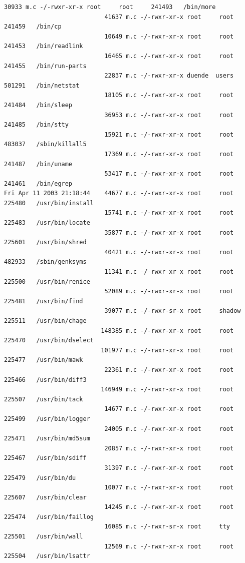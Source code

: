 {\begin{lstlisting}[style=terminal]
                            30933 m.c -/-rwxr-xr-x root     root     241493   /bin/more
                            41637 m.c -/-rwxr-xr-x root     root     241459   /bin/cp
                            10649 m.c -/-rwxr-xr-x root     root     241453   /bin/readlink
                            16465 m.c -/-rwxr-xr-x root     root     241455   /bin/run-parts
                            22837 m.c -/-rwxr-xr-x duende  users    501291   /bin/netstat
                            18105 m.c -/-rwxr-xr-x root     root     241484   /bin/sleep
                            36953 m.c -/-rwxr-xr-x root     root     241485   /bin/stty
                            15921 m.c -/-rwxr-xr-x root     root     483037   /sbin/killall5
                            17369 m.c -/-rwxr-xr-x root     root     241487   /bin/uname
                            53417 m.c -/-rwxr-xr-x root     root     241461   /bin/egrep
Fri Apr 11 2003 21:18:44    44677 m.c -/-rwxr-xr-x root     root     225480   /usr/bin/install
                            15741 m.c -/-rwxr-xr-x root     root     225483   /usr/bin/locate
                            35877 m.c -/-rwxr-xr-x root     root     225601   /usr/bin/shred
                            40421 m.c -/-rwxr-xr-x root     root     482933   /sbin/genksyms
                            11341 m.c -/-rwxr-xr-x root     root     225500   /usr/bin/renice
                            52089 m.c -/-rwxr-xr-x root     root     225481   /usr/bin/find
                            39077 m.c -/-rwxr-sr-x root     shadow   225511   /usr/bin/chage
                           148385 m.c -/-rwxr-xr-x root     root     225470   /usr/bin/dselect
                           101977 m.c -/-rwxr-xr-x root     root     225477   /usr/bin/mawk
                            22361 m.c -/-rwxr-xr-x root     root     225466   /usr/bin/diff3
                           146949 m.c -/-rwxr-xr-x root     root     225507   /usr/bin/tack
                            14677 m.c -/-rwxr-xr-x root     root     225499   /usr/bin/logger
                            24005 m.c -/-rwxr-xr-x root     root     225471   /usr/bin/md5sum
                            20857 m.c -/-rwxr-xr-x root     root     225467   /usr/bin/sdiff
                            31397 m.c -/-rwxr-xr-x root     root     225479   /usr/bin/du
                            10077 m.c -/-rwxr-xr-x root     root     225607   /usr/bin/clear
                            14245 m.c -/-rwxr-xr-x root     root     225474   /usr/bin/faillog
                            16085 m.c -/-rwxr-sr-x root     tty      225501   /usr/bin/wall
                            12569 m.c -/-rwxr-xr-x root     root     225504   /usr/bin/lsattr

\end{lstlisting}}
